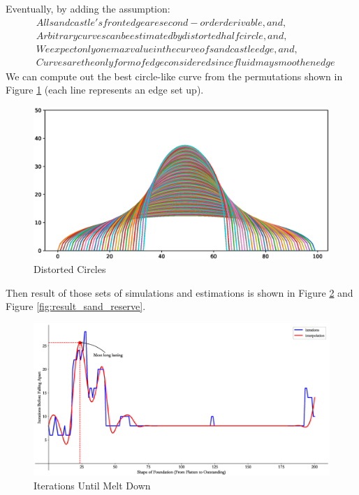 \documentclass[12pt]{article}
\begin{document}
\par
Eventually, by adding the assumption:
\begin{align*}
     & All sand castle's front edge are second-order derivable, and,             \\
     & Arbitrary curves can be estimated by distorted half circle, and,          \\
     & We expect only one max value in the curve of sand castle edge, and,       \\
     & Curves are the only form of edge considered since fluid may smoothen edge
\end{align*}
We can compute out the best circle-like curve from the permutations shown in Figure \ref{fig:curve} (each line represents an edge set up).
\begin{figure}[H]
    \centering
    \includegraphics[width=0.8\linewidth]{distorted_circle.eps}
    \caption{Distorted Circles}
    \label{fig:curve}
\end{figure}
Then result of those sets of simulations and estimations is shown in Figure \ref{fig:result_iterations} and Figure \ref{fig:result_sand_reserve}.
\begin{figure}[H]
    \centering
    \includegraphics[width=0.95\linewidth]{iterations.eps}
    \caption{Iterations Until Melt Down}
    \label{fig:result_iterations}
\end{figure}
\end{document}
